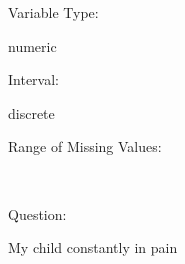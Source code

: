 \documentclass[
]{article}
\begin{document}
\begin{minipage}[t]{0.3\linewidth}

Variable Type:

\end{minipage}%
\begin{minipage}[t]{0.7\linewidth}

numeric

\end{minipage}

\begin{minipage}[t]{0.3\linewidth}

Interval:

\end{minipage}%
\begin{minipage}[t]{0.7\linewidth}

discrete

\end{minipage}

\begin{minipage}[t]{0.3\linewidth}

Range of Missing Values:

\end{minipage}%
\begin{minipage}[t]{0.7\linewidth}

~

\end{minipage}

\begin{minipage}[t]{0.3\linewidth}

Question:

\end{minipage}%
\begin{minipage}[t]{0.7\linewidth}

My child constantly in pain

\end{minipage}
\end{document}
